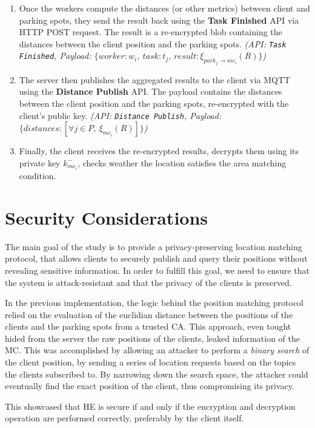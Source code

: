 \documentclass[12pt,a4paper,twoside]{book}
\begin{document}
\begin{enumerate}
    \item Once the workers compute the distances (or other metrics) between client and parking spots, they send the result back using the \textbf{Task Finished} API via HTTP POST request. The result is a re-encrypted blob containing the distances between the client position and the parking spots. \emph{(API: \texttt{Task Finished}, Payload: $\{worker: w_i,\ task: t_j,\ result: \xi_{park_j \to mc_i}(R)\}$)}
    \item The server then publishes the aggregated results to the client via MQTT using the \textbf{Distance Publish} API. The payload contains the distances between the client position and the parking spots, re-encrypted with the client's public key. \emph{(API: \texttt{Distance Publish}, Payload: $\{distances: [\forall j \in P,\ \xi_{mc_i}(R)]\}$)}
    \item Finally, the client receives the re-encrypted results, decrypts them using its private key $k_{mc_i}^-$, checks weather the location satisfies the area matching condition.
\end{enumerate}

\section{Security Considerations}

The main goal of the study is to provide a privacy-preserving location matching protocol, that allows clients to securely publish and query their positions without revealing sensitive information. In order to fulfill this goal, we need to ensure that the system is attack-resistant and that the privacy of the clients is preserved.

In the previous implementation\citep{genova2024helamqtt}, the logic behind the position matching protocol relied on the evaluation of the euclidian distance between the positions of the clients and the parking spots from a trusted CA. This approach, even tought hided from the server the raw positions of the clients, leaked information of the MC. This was accomplished by allowing an attacker to perform a \emph{binary search} of the client position, by sending a series of location requests based on the topics the clients subscribed to. By narrowing down the search space, the attacker could eventually find the exact position of the client, thus compromising its privacy.

This showcased that HE is secure if and only if the encryption and decryption operation are performed correctly, preferably by the client itself.
\end{document}

